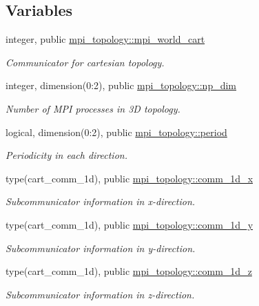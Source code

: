 \subsection*{Variables}
\begin{DoxyCompactItemize}
\item 
integer, public \hyperlink{namespacempi__topology_a2b10bc780ba4b14ea773c36f3e489a94}{mpi\+\_\+topology\+::mpi\+\_\+world\+\_\+cart}
\begin{DoxyCompactList}\small\item\em Communicator for cartesian topology. \end{DoxyCompactList}\item 
integer, dimension(0\+:2), public \hyperlink{namespacempi__topology_ac837e97cb4896a72d94eb7a9f12d6682}{mpi\+\_\+topology\+::np\+\_\+dim}
\begin{DoxyCompactList}\small\item\em Number of M\+PI processes in 3D topology. \end{DoxyCompactList}\item 
logical, dimension(0\+:2), public \hyperlink{namespacempi__topology_ac24cb383bdfbdf566165cf78b03677aa}{mpi\+\_\+topology\+::period}
\begin{DoxyCompactList}\small\item\em Periodicity in each direction. \end{DoxyCompactList}\item 
type(cart\+\_\+comm\+\_\+1d), public \hyperlink{namespacempi__topology_a4ef8d80f442649d77707d5ebeeefa391}{mpi\+\_\+topology\+::comm\+\_\+1d\+\_\+x}
\begin{DoxyCompactList}\small\item\em Subcommunicator information in x-\/direction. \end{DoxyCompactList}\item 
type(cart\+\_\+comm\+\_\+1d), public \hyperlink{namespacempi__topology_ad48a88602b9b9950200733823f95b5d0}{mpi\+\_\+topology\+::comm\+\_\+1d\+\_\+y}
\begin{DoxyCompactList}\small\item\em Subcommunicator information in y-\/direction. \end{DoxyCompactList}\item 
type(cart\+\_\+comm\+\_\+1d), public \hyperlink{namespacempi__topology_aed5c66dd4697b116c53db4613ad802ce}{mpi\+\_\+topology\+::comm\+\_\+1d\+\_\+z}
\begin{DoxyCompactList}\small\item\em Subcommunicator information in z-\/direction. \end{DoxyCompactList}\end{DoxyCompactItemize}


